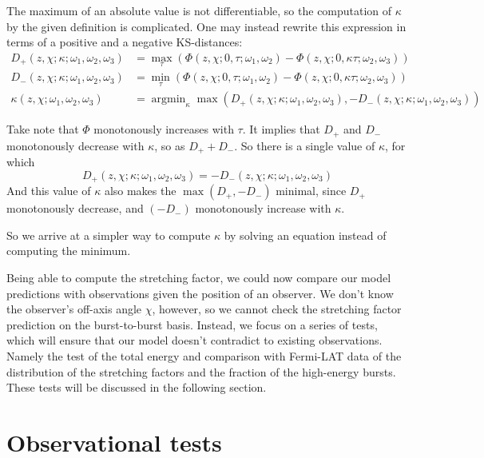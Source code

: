 \documentclass{article}
\DeclareMathOperator*{\argmin}{argmin}
\begin{document}
The maximum of an absolute value is not differentiable, so the
computation of $\kappa$ by the given definition is complicated. One
may instead rewrite this expression in terms of a positive and a
negative KS-distances:
\begin{align*}
D_+\left(z,\chi; \kappa; \omega_1, \omega_2, \omega_3\right) &= \max_\tau\left( \Phi\left(z,\chi; 0,\tau; \omega_1,\omega_2\right) - \Phi\left( z,\chi; 0,\kappa \tau; \omega_2,\omega_3 \right) \right) \\
D_-\left(z,\chi; \kappa; \omega_1, \omega_2, \omega_3\right) &= \min_\tau\left( \Phi\left(z,\chi; 0,\tau; \omega_1,\omega_2\right) - \Phi\left( z,\chi; 0,\kappa \tau; \omega_2,\omega_3 \right) \right) \\
\kappa\left(z,\chi; \omega_1, \omega_2, \omega_3\right) &= \argmin_\kappa \max\left(D_+\left(z,\chi; \kappa; \omega_1, \omega_2, \omega_3\right), -D_-\left(z,\chi; \kappa; \omega_1, \omega_2, \omega_3\right)\right)
\end{align*}

Take note that $\Phi$ monotonously increases with $\tau$. It implies that $D_+$ and $D_-$ monotonously decrease with $\kappa$, so as $D_+ + D_-$. So there is a single value of $\kappa$, for which
\begin{equation}
D_+\left(z,\chi; \kappa; \omega_1, \omega_2, \omega_3\right) = -D_-\left(z,\chi; \kappa; \omega_1, \omega_2, \omega_3\right)
\end{equation}
And this value of $\kappa$ also makes the $\max\left({D_+, -D_-}\right)$ minimal, since $D_+$ monotonously decrease, and $\left(-D_-\right)$ monotonously increase with $\kappa$.

So we arrive at a simpler way to compute $\kappa$ by solving an
equation instead of computing the minimum. 

Being able to compute the stretching factor, we could now compare our
model predictions with observations given the position of an
observer. We don't know the observer's off-axis angle $\chi$, however,
so we cannot check the stretching factor prediction on the
burst-to-burst basis. Instead, we focus on a series of tests, which
will ensure that our model doesn't contradict to existing
observations. Namely the test of the total energy and comparison with
Fermi-LAT data of the distribution of the stretching factors and the
fraction of the high-energy bursts. These tests will be discussed in
the following section.

\section{Observational tests}
\label{sec:tests}
\end{document}
